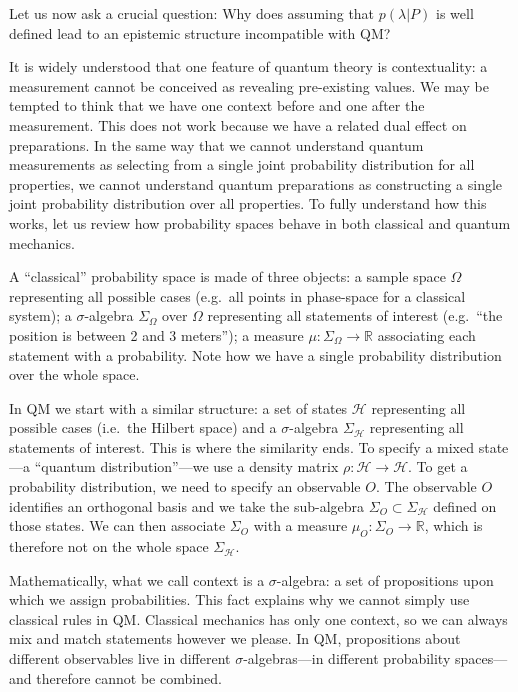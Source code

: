 \documentclass[twocolumn,prl,floatfix,superscriptaddress]{revtex4-2}
\begin{document}
Let us now ask a crucial question: Why does assuming that $p(\lambda|P)$ is well defined lead to an epistemic structure incompatible with QM?

It is widely understood that one feature of quantum theory is contextuality: a measurement cannot be conceived as revealing pre-existing values. We may be tempted to think that we have one context before and one after the measurement. This does not work because we have a related dual effect on preparations. In the same way that we cannot understand quantum measurements as selecting from a single joint probability distribution for all properties, we cannot understand quantum preparations as constructing a single joint probability distribution over all properties. To fully understand how this works, let us review how probability spaces behave in both classical and quantum mechanics.

A ``classical'' probability space is made of three objects: a sample space $\Omega$ representing all possible cases (e.g.\ all points in phase-space for a classical system); a $\sigma$-algebra $\Sigma_\Omega$ over $\Omega$  representing all statements of interest (e.g.\ ``the position is between 2 and 3 meters''); a measure $\mu : \Sigma_\Omega \to \mathbb{R}$ associating each statement with a probability. Note how we have a single probability distribution over the whole space.

In QM we start with a similar structure: a set of states $\mathcal{H}$ representing all possible cases (i.e.\ the Hilbert space) and a $\sigma$-algebra $\Sigma_{\mathcal{H}}$ representing all statements of interest. This is where the similarity ends. To specify a mixed state---a ``quantum distribution''---we use a density matrix $\rho : \mathcal{H} \to \mathcal{H}$. To get a probability distribution, we need to specify an observable $O$. The observable $O$ identifies an orthogonal basis and we take the sub-algebra $\Sigma_O \subset \Sigma_{\mathcal{H}}$ defined on those states. We can then associate $\Sigma_O$ with a measure $\mu_O : \Sigma_O \to \mathbb{R}$, which is therefore not on the whole space $\Sigma_{\mathcal{H}}$.

Mathematically, what we call context is a $\sigma$-algebra: a set of propositions upon which we assign probabilities. This fact explains why we cannot simply use classical rules in QM. Classical mechanics has only one context, so we can always mix and match statements however we please. In QM, propositions about different observables live in different $\sigma$-algebras---in different probability spaces---and therefore cannot be combined.
\end{document}
